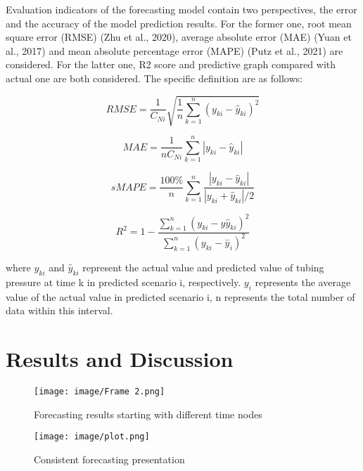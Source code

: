 \documentclass[sn-mathphys,Numbered]{sn-jnl}%
\theoremstyle{thmstyleone}%
\theoremstyle{thmstyletwo}%
\theoremstyle{thmstylethree}%
\begin{document}
Evaluation indicators of the forecasting model contain two perspectives, the error and the accuracy of the model prediction results. For the former one, root mean square error (RMSE) (Zhu et al., 2020), average absolute error (MAE) (Yuan et al., 2017) and mean absolute percentage error (MAPE) (Putz et al., 2021) are considered. For the latter one, R2 score and predictive graph compared with actual one are both considered. The specific definition are as follows:

\begin{equation}
RMSE = \frac{1}{C_{Ni}}\sqrt{\frac{1}{n}{\sum\limits_{k = 1}^{n}\left( y_{ki} - {\hat{y}}_{ki} \right)^{2}}}
\end{equation}

\begin{equation}
MAE = \frac{1}{nC_{Ni}}{\sum\limits_{k = 1}^{n}\left| {y_{ki} - {\hat{y}}_{ki}} \right|}
\end{equation}

\begin{equation}
sMAPE = \frac{100\%}{n}{\sum\limits_{k = 1}^{n}\frac{\left| {y_{ki} - {\hat{y}}_{ki}} \right|}{\left| {y_{ki} + {\hat{y}}_{ki}} \right|/2}}
\end{equation}

\begin{equation}
R^{2} = 1 - \frac{\sum\limits_{k = 1}^{n}\left( {y_{ki} - {y\hat{y}}_{ki}} \right)^{2}}{\sum\limits_{k = 1}^{n}\left( {y_{ki} - {\overset{-}{y}}_{i}} \right)^{2}}
\end{equation}

where $y_{ki}$ and ${\hat{y}}_{ki}$ represent the actual value and predicted value of tubing pressure at time k in predicted scenario i, respectively. $y_{i}$ represents the average value of the actual value in predicted scenario i, n represents the total number of data within this interval.

\section{Results and Discussion}\label{sec4}

\begin{figure}[htp]
    \centering
    \texttt{[image: image/Frame 2.png]}
    \caption{\centering Forecasting results starting with different time nodes}
    \label{fig:9}
\end{figure}

\begin{figure}[htp]
    \centering
    \texttt{[image: image/plot.png]}
    \caption{\centering  Consistent forecasting presentation}
    \label{fig:consistent}
\end{figure}
\end{document}
